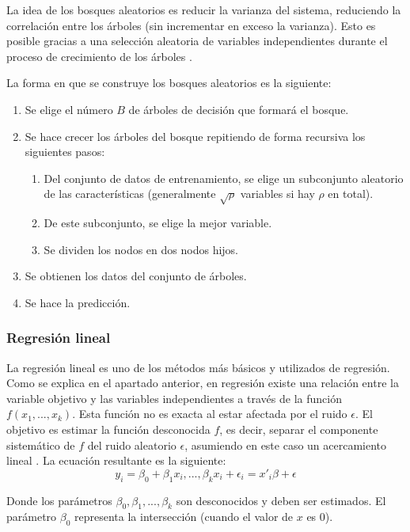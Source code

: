 \documentclass[12pt,a4paper]{article}
\begin{document}
La idea de los bosques aleatorios es reducir la varianza del sistema, reduciendo la correlación entre los árboles (sin incrementar en exceso la varianza). Esto es posible gracias a una selección aleatoria de variables independientes durante el proceso de crecimiento de los árboles \cite{hastie2009elements}.


La forma en que se construye los bosques aleatorios es la siguiente:
\begin{enumerate}
	\item Se elige el número $B$ de árboles de decisión que formará el bosque.
	\item Se hace crecer los árboles del bosque repitiendo de forma recursiva los siguientes pasos:
	\begin{enumerate}
		\item Del conjunto de datos de entrenamiento, se elige un subconjunto aleatorio de las características (generalmente $\sqrt{\rho}$ variables si hay $\rho$ en total).
		\item De este subconjunto, se elige la mejor variable.
		\item Se dividen los nodos en dos nodos hijos.
	\end{enumerate}
	\item Se obtienen los datos del conjunto de árboles.
	\item Se hace la predicción.
\end{enumerate}


\subsubsection{Regresión lineal}
La regresión lineal es uno de los métodos más básicos y  utilizados de regresión. Como se explica en el apartado anterior, en regresión existe una relación entre la variable objetivo y las variables independientes a través de la función $f(x_1, ..., x_k)$. Esta función no es exacta al estar afectada por el ruido $\epsilon$. El objetivo es estimar la función desconocida $f$, es decir, separar el componente sistemático de $f$ del ruido aleatorio $\epsilon$, asumiendo en este caso un acercamiento lineal \cite{fahrmeir2013regression}. La ecuación resultante es la siguiente:
\begin{equation}
	y_i = 
	\beta_0 + \beta_1x_i, ..., \beta_kx_i + \epsilon_i = 
	 x'_i\beta + \epsilon 
\end{equation}
 
Donde los parámetros $\beta_0, \beta_1, ..., \beta_k$ son desconocidos y deben ser estimados. El parámetro $\beta_0$ representa la intersección (cuando el valor de $x$ es 0).
\end{document}
